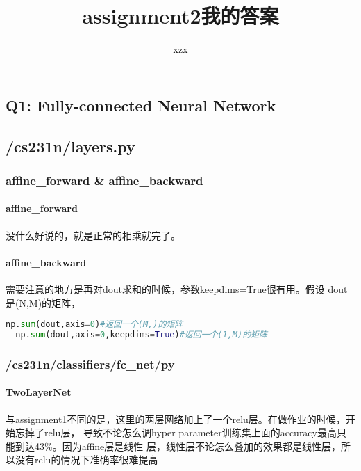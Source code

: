 \documentclass{ctexart}
\author{xzx}
\title{assignment2我的答案}
\begin{document}
\maketitle
\setcounter{page}{0}
\thispagestyle{empty}
\newpage

\begin{flushleft}

\section{Q1: Fully-connected Neural Network}

\subsection{/cs231n/layers.py}

\subsubsection{affine\_forward \& affine\_backward}
\paragraph{affine\_forward}没什么好说的，就是正常的相乘就完了。\\
\paragraph{affine\_backward}需要注意的地方是再对dout求和的时候，参数keepdims=True很有用。假设
dout是(N,M)的矩阵，
\begin{lstlisting}[language=python]
  np.sum(dout,axis=0)#返回一个(M,)的矩阵
  np.sum(dout,axis=0,keepdims=True)#返回一个(1,M)的矩阵
\end{lstlisting}


\subsubsection{/cs231n/classifiers/fc\_net/py}
\paragraph{TwoLayerNet}
与assignment1不同的是，这里的两层网络加上了一个relu层。在做作业的时候，开始忘掉了relu层，
导致不论怎么调hyper parameter训练集上面的accuracy最高只能到达43\%。因为affine层是线性
层，线性层不论怎么叠加的效果都是线性层，所以没有relu的情况下准确率很难提高


\end{flushleft}
\end{document}
